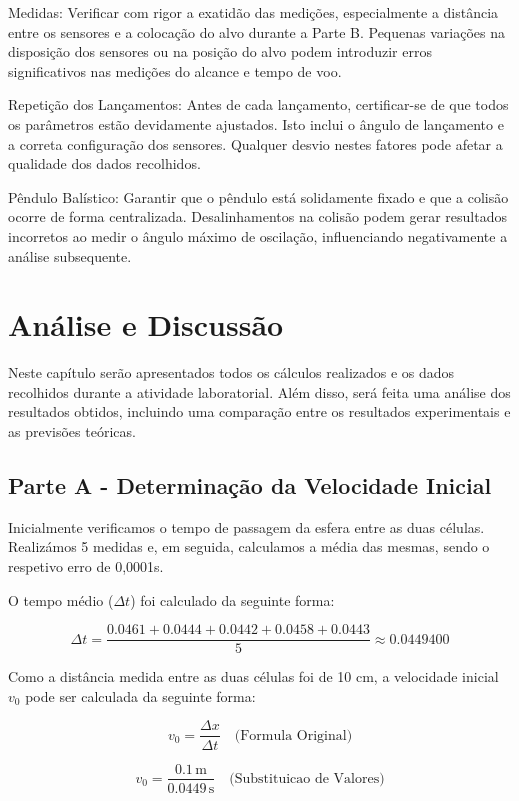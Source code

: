 \documentclass{report}
\begin{document}
Medidas: Verificar com rigor a exatidão das medições, especialmente a distância entre os sensores e a colocação do alvo durante a Parte B. Pequenas variações na disposição dos sensores ou na posição do alvo podem introduzir erros significativos nas medições do alcance e tempo de voo.

Repetição dos Lançamentos: Antes de cada lançamento, certificar-se de que todos os parâmetros estão devidamente ajustados. Isto inclui o ângulo de lançamento e a correta configuração dos sensores. Qualquer desvio nestes fatores pode afetar a qualidade dos dados recolhidos.

Pêndulo Balístico: Garantir que o pêndulo está solidamente fixado e que a colisão ocorre de forma centralizada. Desalinhamentos na colisão podem gerar resultados incorretos ao medir o ângulo máximo de oscilação, influenciando negativamente a análise subsequente.

\chapter{Análise e Discussão}
\label{chap.analise}

Neste capítulo serão apresentados todos os cálculos realizados e os dados recolhidos durante a atividade laboratorial. Além disso, será feita uma análise dos resultados obtidos, incluindo uma comparação entre os resultados experimentais e as previsões teóricas.

\section{Parte A - Determinação da Velocidade Inicial}

Inicialmente verificamos o tempo de passagem da esfera entre as duas células. Realizámos 5 medidas e, em seguida, calculamos a média das mesmas, sendo o respetivo erro de 0,0001s.

O tempo médio (\(\Delta t\)) foi calculado da seguinte forma:

\[
\Delta t = \frac{0.0461 + 0.0444 + 0.0442 + 0.0458 + 0.0443}{5} \approx 0.0449400
\]

Como a distância medida entre as duas células foi de 10 cm, a velocidade inicial \(v_0\) pode ser calculada da seguinte forma:

\[
v_0 = \frac{\Delta x}{\Delta t} \quad \text{(Formula Original)}
\]

\[
v_0 = \frac{0.1 \, \text{m}}{0.0449 \, \text{s}} \quad \text{(Substituicao de Valores)}
\]
\end{document}
